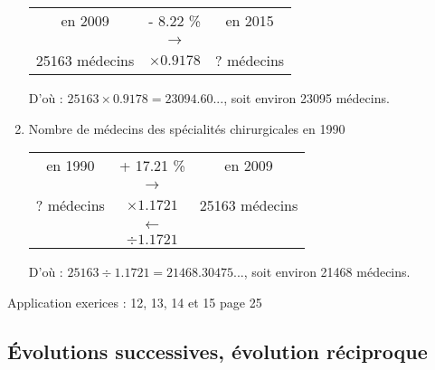 \documentclass[12pt,a4paper]{article}
\begin{document}
\begin{enumerate}[label=\arabic*. ]
	\begin{table}[h!]
		\centering
		\begin{tabular}{|ccc|}
			\hline
			en \num{2009} & - \num{8.22} \%  & en \num{2015} \\
			& {\LARGE $\rightarrow$} &			\\
			\num{25163} médecins& $\times \num{0.9178}$ & ? médecins \\
			\hline
		\end{tabular}
	\end{table}
	
	D'où : $\num{25163} \times \num{0.9178} = \num{23094.60}...$, soit environ \num{23095} médecins.
	
	\vspace*{2cm}
	\item Nombre de médecins des spécialités chirurgicales en 1990 
	
	\begin{table}[h!]
		\centering
		\begin{tabular}{|ccc|}
			\hline
			en \num{1990} & + \num{17.21} \%  & en \num{2009} \\
			& {\LARGE $\rightarrow$} &			\\
			? médecins& $\times \num{1.1721}$ & 25163 médecins \\
			\hline
			& {\LARGE $\leftarrow$} & \\
			& $\div \num{1.1721}$ & \\
			\hline
		\end{tabular}
	\end{table}
	
	D'où : $\num{25163} \div \num{1.1721} = \num{21468.30475}...$, soit environ \num{21468} médecins.
\end{enumerate}

\begin{myexos}
	Application exerices : 12, 13, 14 et 15 page 25
\end{myexos}

\subsection{\'Evolutions successives, évolution réciproque}
\end{document}
